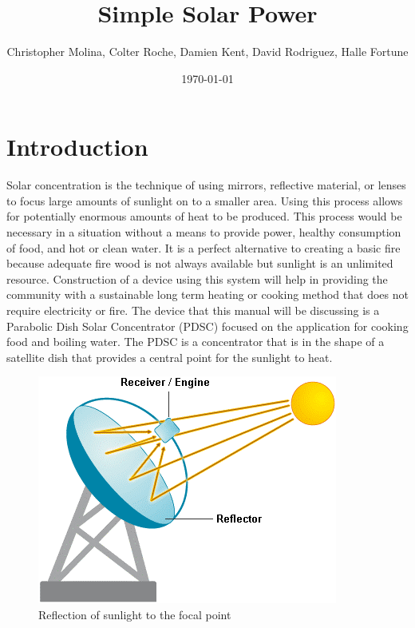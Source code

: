 \documentclass{article}
\begin{document}
    \title{Simple Solar Power}
    \author{Christopher Molina, Colter Roche, Damien Kent, David Rodriguez, Halle Fortune}
    \date{\today}
    \maketitle
    \newpage

    \tableofcontents
    \listoffigures
    \printglossary[type=\acronymtype]
    \newpage

    \section{Introduction}
        Solar concentration is the technique of using mirrors, reflective material, or lenses to focus large 
        amounts of sunlight on to a smaller area. Using this process allows for potentially enormous amounts of heat 
        to be produced. This process would be necessary in a situation without a means to provide power, healthy 
        consumption of food, and hot or clean water. It is a perfect alternative to creating a basic fire because 
        adequate fire wood is not always available but sunlight is an unlimited resource. Construction of a device 
        using this system will help in providing the community with a sustainable long term heating or cooking method 
        that does not require electricity or fire. The device that this manual will be discussing is a Parabolic 
        Dish Solar Concentrator (PDSC) focused on the application for cooking food and boiling water. The PDSC is a 
        concentrator that is in the shape of a satellite dish that provides a central point for the sunlight to heat. 
        \begin{figure}
            \includegraphics[scale=.5]{Concentrator-diagram}
            \caption{Reflection of sunlight to the focal point\cite{Reflector}}
        \end{figure}
\end{document}
